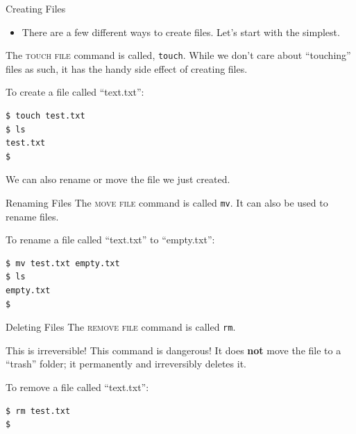 \begin{frame}[fragile]{Creating Files}
  \begin{itemize}
    \item
      There are a few different ways to create files.  Let's start with the
      simplest.
  \end{itemize}
  \pause
  \alert<2>{The \textsc{touch file} command is called, \texttt{touch}.}  While
  we don't care about \enquote{touching} files as such, it has the handy side
  effect of creating files.
  \pause
  \begin{example}[touch]
    To create a file called \enquote{text.txt}:
    \begin{verbatim}
$ touch test.txt
$ ls
test.txt
$
    \end{verbatim}
  \end{example}
\end{frame}

We can also rename or move the file we just created.

\begin{frame}[fragile]{Renaming Files}
  \alert<1>{The \textsc{move file} command is called \texttt{mv}.}  It can also
  be used to rename files.  \pause
  \begin{example}[mv]
    To rename a file called \enquote{text.txt} to \enquote{empty.txt}:
    \begin{verbatim}
$ mv test.txt empty.txt
$ ls
empty.txt
$
    \end{verbatim}
  \end{example}
\end{frame}

\begin{frame}[fragile]{Deleting Files}
  \alert<1>{The \textsc{remove file} command is called \texttt{rm}.}
  \begin{alertblock}{This is irreversible!}
    This command is dangerous!  It does \textbf{not} move the file to a
    \enquote{trash} folder; it permanently and irreversibly deletes it.
  \end{alertblock}\pause
  \begin{example}[rm]
    To remove a file called \enquote{text.txt}:
    \begin{verbatim}
$ rm test.txt
$
    \end{verbatim}
  \end{example}
\end{frame}

